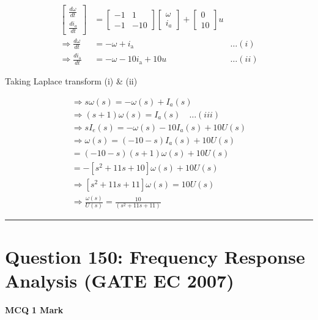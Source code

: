 \documentclass[11pt,a4paper]{article}
\begin{document}
\begin{tcolorbox}[solbox, title=Detailed Solution -- Question 149]
\[
\begin{aligned} \left[\begin{array}{c}\frac{d \omega}{d t} \\\frac{d i_{a}}{d t}\end{array}\right]&=\left[\begin{array}{cc} -1 & 1 \\ -1 & -10 \end{array}\right]\left[\begin{array}{l} \omega \\ i_{a} \end{array}\right]+\left[\begin{array}{c} 0 \\ 10 \end{array}\right] u\\ \Rightarrow \frac{d \omega}{d t}&=-\omega+i_{\mathrm{a}} &\ldots(i)\\ \Rightarrow \frac{d i_{\mathrm{a}}}{d t}&=-\omega-10 i_{\mathrm{a}}+10 u &\ldots(ii) \end{aligned}
\]

 Taking Laplace transform (i) \& (ii) 

\[
\begin{array}{l} \Rightarrow s \omega(s)=-\omega(s)+I_{a}(s) \\ \Rightarrow(s+1) \omega(s)=I_{a}(s) \quad\ldots(iii)\\ \Rightarrow s I_{e}(s)=-\omega(s)-10 I_{a}(s)+10 U(s) \\ \Rightarrow \omega(s)=(-10-s) I_{a}(s)+10 U(s) \\ =(-10-s)(s+1) \omega(s)+10 U(s) \\ =-\left[s^{2}+11 s+10\right] \omega(s)+10 U(s) \\ \Rightarrow\left[s^{2}+11 s+11\right] \omega(s)=10 U(s) \\ \Rightarrow \frac{\omega(s)}{U(s)}=\frac{10}{\left(s^{2}+11 s+11\right)} \end{array}
\]
\end{tcolorbox}

\vspace{1.5em}
\hrule
\vspace{1.5em}

\section*{Question 150: Frequency Response Analysis (GATE EC 2007)}
\noindent \textbf{\color{primary}MCQ} \hfill \textbf{\color{secondary}1 Mark}
\end{document}
